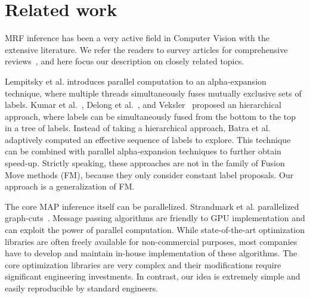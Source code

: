 \section{Related work}


MRF inference has been a very active field in Computer Vision with the
extensive literature. We refer the readers to survey articles for
comprehensive
reviews~\cite{middlebury_mrf,comparative_study_of_modern_inference}, and
here focus our description on closely related topics.


\noindent Lempitsky et al. introduces parallel computation to an
alpha-expansion technique, where multiple threads simultaneously fuses
mutually exclusive sets of labels. Kumar et
al.~\cite{hierarchical_graph_cuts_kumar_and_koller}, Delong et
al.~\cite{delong}, and Veksler~\cite{olga} proposed an hierarchical
approach, where labels can be simultaneously fused from the bottom to
the top in a tree of labels. 
% 
Instead of taking a hierarchical approach, Batra et
al.~\cite{Dhruv_pushmeet_making_the_right_move} adaptively computed an
effective sequence of labels to explore. This technique can be combined
with parallel alpha-expansion techniques to further obtain speed-up.
%
Strictly speaking, these approaches are not in the family of Fusion Move
methods (FM), because they only consider constant label proposals. Our
approach is a generalization of FM.



\noindent The core MAP inference itself can be parallelized.  Strandmark
et al. parallelized graph-cuts~\cite{strandmark2010parallel}.
%
Message passing algorithms are friendly to GPU implementation and can
exploit the power of parallel computation.
%
%
While state-of-the-art optimization libraries are often freely available
for non-commercial purposes, most companies have to develop and maintain
in-house implementation of these algorithms.  The core optimization
libraries are very complex and their modifications require significant
engineering investments. In contrast, our idea is extremely simple and
easily reproducible by standard engineers.





